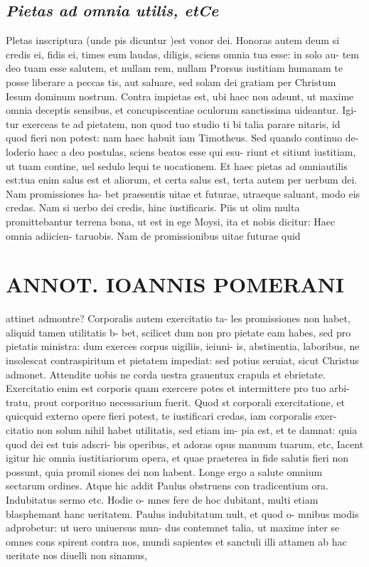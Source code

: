 \documentclass{article}
\begin{document}
\begin{pages}
\subsection*{\textit{Pietas ad omnia utilis, etCe }}\pstart Pletas inscriptura (unde pis dicuntur )est vonor dei. Honoras autem deum si credis ei, fidis ei, times eum laudas, diligis, sciens omnia tua esse: in solo au- tem deo tuam esse salutem, et nullam rem, nullam Prorsus iustitiam humanam te posse liberare a peccas tis, aut saluare, sed solam dei gratiam per Christum Iesum dominum nostrum. Contra impietas est, ubi haec non adsunt, ut maxime omnia deceptis sensibus, et concupiscentiae oculorum sanctissima uideantur. Igi- tur exerceas te ad pietatem, non quod tuo studio ti bi talia parare nitaris, id quod fieri non potest: nam haec habuit iam Timotheus. Sed quando continuo de- loderio haec a deo postulas, sciens beatos esse qui esu- riunt et sitiunt iustitiam, ut tuam contine, uel sedulo lequi te uocationem. Et haec pietas ad omniautilis est:tua enim salus est et aliorum, et certa salus est, terta autem per uerbum dei. Nam promissiones ha- bet praesentis uitae et futurae, utraeque saluant, modo eis credas. Nam si uerbo dei credis, hinc iustificaris. Piis ut olim multa promittebantur terrena bona, ut est in ege Moysi, ita et nobis dicitur: Haec omnia adiicien- taruobis. Nam de promissionibus uitae futurae quid  \pend
\section*{ANNOT. IOANNIS POMERANI }\pstart attinet admontre? Corporalis autem exercitatio ta- les promissiones non habet, aliquid tamen utilitatis b- bet, scilicet dum non pro pietate eam habes, sed pro pietatis ministra: dum exerces corpus uigiliis, ieiuni- is, abstinentia, laboribus, ne insolescat contraspiritum et pietatem impediat: sed potius seruiat, sicut Christus admonet. Attendite uobis ne corda uestra grauentux crapula et ebrietate. Exercitatio enim est corporis quam exercere potes et intermittere pro tuo arbi- tratu, prout corporituo necessarium fuerit. Quod st corporali exercitatione, et quicquid externo opere fieri potest, te iustificari credas, iam corporalis exer- citatio non solum nihil habet utilitatis, sed etiam im- pia est, et te damnat: quia quod dei est tuis adscri- bis operibus, et adoras opus manuum tuarum, etc, Iacent igitur hic omnia iustitiariorum opera, et quae praeterea in fide salutis fieri non possunt, quia promil siones dei non habent. Longe ergo a salute omnium sectarum ordines. Atque hic addit Paulus obstruens con tradicentium ora. Indubitatus sermo etc. Hodie o- mnes fere de hoc dubitant, multi etiam blasphemant hanc ueritatem. Paulus indubitatum uult, et quod o- mnibus modis adprobetur: ut uero uniuersus mun- dus contemnet talia, ut maxime inter se omnes cons spirent contra nos, mundi sapientes et sanctuli illi attamen ab hac ueritate nos diuelli non sinamus,  \pend

\end{pages}
\end{document}
